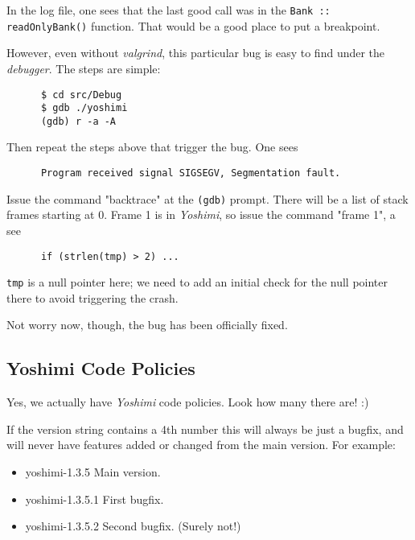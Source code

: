    In the log file, one sees that the last good call was in the
   \texttt{Bank :: readOnlyBank()} function.  That would be a good place to
   put a breakpoint.

   However, even without \textsl{valgrind}, this particular bug is easy to
   find under the \textsl{debugger}.  The steps are simple:

   \begin{verbatim}
      $ cd src/Debug
      $ gdb ./yoshimi
      (gdb) r -a -A
   \end{verbatim}

   Then repeat the steps above that trigger the bug.
   One sees

   \begin{verbatim}
      Program received signal SIGSEGV, Segmentation fault.
   \end{verbatim}

   Issue the command "backtrace" at the \texttt{(gdb)} prompt.  There will
   be a list of stack frames starting at 0.  Frame 1 is in \textsl{Yoshimi},
   so issue the command "frame 1", a see

   \begin{verbatim}
      if (strlen(tmp) > 2) ...
   \end{verbatim}

   \texttt{tmp} is a null pointer here; we need to add an initial check for
   the null pointer there to avoid triggering the crash.

   Not worry now, though, the bug has been officially fixed.

\subsection{Yoshimi Code Policies}
\label{subsec:yoshimi_code_policies}

   Yes, we actually have \textsl{Yoshimi} code policies.
   Look how many there are! :)

   If the version string contains a 4th number this will always be just a
   bugfix, and will never have features added or changed from the main version.
   For example:

   \begin{itemize}
      \item yoshimi-1.3.5   Main version.
      \item yoshimi-1.3.5.1 First bugfix.
      \item yoshimi-1.3.5.2 Second bugfix. (Surely not!)
   \end{itemize}

